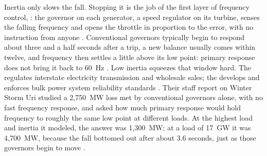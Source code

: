 Inertia only slows the fall. Stopping it is the job of the first layer of frequency control, : the governor on each generator, a speed regulator on its turbine, senses the falling frequency and opens the throttle in proportion to the error, with no instruction from anyone \autocite{NERCBalancingFrequency2021}. %
Conventional governors typically begin to respond about three and a half seconds after a trip, a new balance usually comes within twelve, and frequency then settles a little above its low point: primary response does not bring it back to 60~Hz \autocite{FERCNERCFeb2021,NERCBalancingFrequency2021}. %
Low inertia squeezes that window hard. The  regulates interstate electricity transmission and wholesale sales; the  develops and enforces bulk power system reliability standards \autocite{fercrole2026,nercrole2026}. Their staff report on Winter Storm Uri studied a 2,750~MW loss met by conventional governors alone, with no fast frequency response, and asked how much primary response would hold frequency to roughly the same low point at different loads. %
At the highest load and inertia it modeled, the answer was 1,300~MW; at a load of 17~GW it was 4,700~MW, because the fall bottomed out after about 3.6 seconds, just as those governors begin to move \autocite{FERCNERCFeb2021}. %
